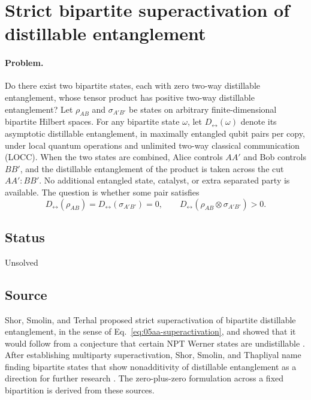 \section{Strict bipartite superactivation of distillable entanglement}
\label{sec:op_05aafd29a672085a}

\paragraph{Problem.}
Do there exist two bipartite states, each with zero two-way distillable entanglement, whose tensor product has positive two-way distillable entanglement?
Let $\rho_{AB}$ and $\sigma_{A'B'}$ be states on arbitrary finite-dimensional bipartite Hilbert spaces. For any bipartite state $\omega$, let $D_{\leftrightarrow}(\omega)$ denote its asymptotic distillable entanglement, in maximally entangled qubit pairs per copy, under local quantum operations and unlimited two-way classical communication (LOCC). When the two states are combined, Alice controls $AA'$ and Bob controls $BB'$, and the distillable entanglement of the product is taken across the cut $AA':BB'$. No additional entangled state, catalyst, or extra separated party is available. The question is whether some pair satisfies
\begin{equation}
 D_{\leftrightarrow}(\rho_{AB})=D_{\leftrightarrow}(\sigma_{A'B'})=0,
 \qquad
 D_{\leftrightarrow}(\rho_{AB}\otimes\sigma_{A'B'})>0.
 \label{eq:05aa-superactivation}
\end{equation}

\subsection*{Status}

Unsolved

\subsection*{Source}

Shor, Smolin, and Terhal proposed strict superactivation of bipartite distillable entanglement, in the sense of Eq.~\eqref{eq:05aa-superactivation}, and showed that it would follow from a conjecture that certain NPT Werner states are undistillable . After establishing multiparty superactivation, Shor, Smolin, and Thapliyal name finding bipartite states that show nonadditivity of distillable entanglement as a direction for further research . The zero-plus-zero formulation across a fixed bipartition is derived from these sources.

